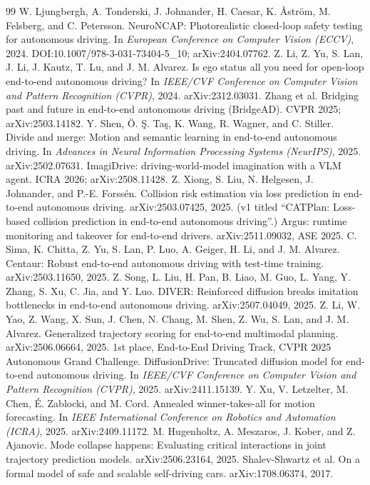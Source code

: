 \documentclass[11pt]{article}
\begin{document}
\begin{thebibliography}{99}\small
{} W. Ljungbergh, A. Tonderski, J. Johnander, H. Caesar, K. {\AA}str{\"o}m,
M. Felsberg, and C. Petersson. NeuroNCAP: Photorealistic closed-loop safety testing for
autonomous driving. In \emph{European Conference on Computer Vision (ECCV)}, 2024.
DOI:10.1007/978-3-031-73404-5\_10; arXiv:2404.07762.
 Z. Li, Z. Yu, S. Lan, J. Li, J. Kautz, T. Lu, and J. M. Alvarez. Is ego
status all you need for open-loop end-to-end autonomous driving? In \emph{IEEE/CVF Conference on
Computer Vision and Pattern Recognition (CVPR)}, 2024. arXiv:2312.03031.
 Zhang et al. Bridging past and future in end-to-end autonomous driving
(BridgeAD). CVPR 2025; arXiv:2503.14182.
 Y. Shen, {\"O}. {\c{S}}. Ta{\c{s}}, K. Wang, R. Wagner, and C. Stiller. Divide and
merge: Motion and semantic learning in end-to-end autonomous driving. In \emph{Advances in Neural
Information Processing Systems (NeurIPS)}, 2025. arXiv:2502.07631.
 ImagiDrive: driving-world-model imagination with a VLM agent. ICRA 2026;
arXiv:2508.11428.
 Z. Xiong, S. Liu, N. Helgesen, J. Johnander, and P.-E. Forss{\'e}n. Collision
risk estimation via loss prediction in end-to-end autonomous driving. arXiv:2503.07425, 2025.
(v1 titled ``CATPlan: Loss-based collision prediction in end-to-end autonomous driving''.)
 Argus: runtime monitoring and takeover for end-to-end drivers. arXiv:2511.09032,
ASE 2025.
 C. Sima, K. Chitta, Z. Yu, S. Lan, P. Luo, A. Geiger, H. Li, and J. M. Alvarez.
Centaur: Robust end-to-end autonomous driving with test-time training. arXiv:2503.11650, 2025.
 Z. Song, L. Liu, H. Pan, B. Liao, M. Guo, L. Yang, Y. Zhang, S. Xu, C. Jia, and
Y. Luo. DIVER: Reinforced diffusion breaks imitation bottlenecks in end-to-end autonomous
driving. arXiv:2507.04049, 2025.
 Z. Li, W. Yao, Z. Wang, X. Sun, J. Chen, N. Chang, M. Shen, Z. Wu, S. Lan, and
J. M. Alvarez. Generalized trajectory scoring for end-to-end multimodal planning.
arXiv:2506.06664, 2025. 1st place, End-to-End Driving Track, CVPR 2025 Autonomous Grand
Challenge.
 DiffusionDrive: Truncated diffusion model for end-to-end autonomous
driving. In \emph{IEEE/CVF Conference on Computer Vision and Pattern Recognition (CVPR)}, 2025.
arXiv:2411.15139.
 Y. Xu, V. Letzelter, M. Chen, {\'E}. Zablocki, and M. Cord. Annealed
winner-takes-all for motion forecasting. In \emph{IEEE International Conference on Robotics and
Automation (ICRA)}, 2025. arXiv:2409.11172.
 M. Hugenholtz, A. Meszaros, J. Kober, and Z. Ajanovic. Mode collapse
happens: Evaluating critical interactions in joint trajectory prediction models.
arXiv:2506.23164, 2025.
 Shalev-Shwartz et al. On a formal model of safe and scalable self-driving cars.
arXiv:1708.06374, 2017.
\end{thebibliography}
\end{document}
